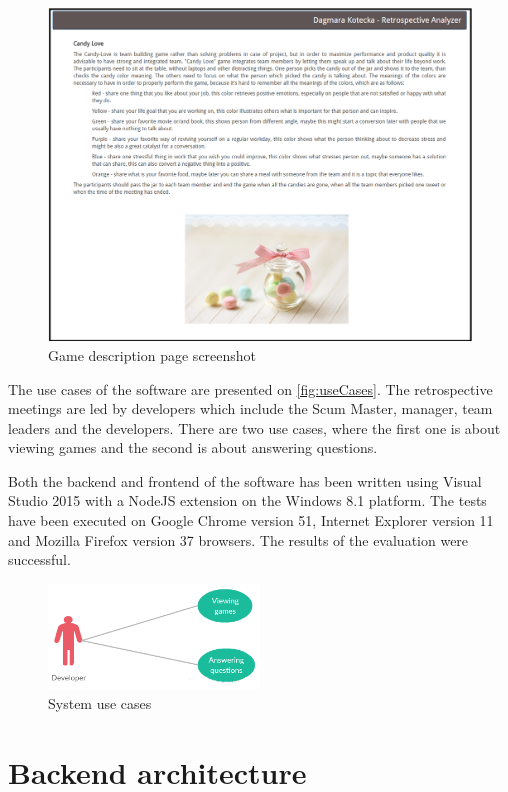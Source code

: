 \begin{figure}[h]
\caption{Game description page screenshot}
\label{fig:gameDescPage}
\centering
\includegraphics[width=1\textwidth]{screenshots/gameDesc.png}
\end{figure}

The use cases of the software are presented on \autoref{fig:useCases}. The retrospective meetings are led by developers which include the Scum Master, manager, team leaders and the developers. There are two use cases, where the first one is about viewing games and the second is about answering questions.

Both the backend and frontend of the software has been written using Visual Studio 2015 with a NodeJS extension on the Windows 8.1 platform. The tests have been executed on Google Chrome version 51, Internet Explorer version 11 and Mozilla Firefox version 37 browsers. The results of the evaluation were successful.

\begin{figure}[h]
\caption{System use cases}
\label{fig:useCases}
\centering
\includegraphics[width=0.5\textwidth]{img/useCases}
\end{figure}

\section{Backend architecture}


